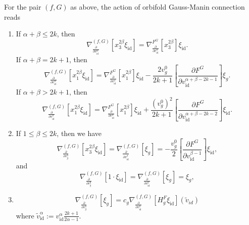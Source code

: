 \documentclass[10pt,a4paper]{amsart}
\newcommand{\id}{\mathrm{id}}
\def\p{\partial }
\begin{document}
\begin{proposition}{\label{EF4}}
    For the pair $(f,G)$ as above, the action of orbifold Gauss-Manin connection reads
\begin{enumerate}
\item If $\alpha+\beta \le 2k$, then
\[
\nabla_{\frac{\partial}{\partial v^\alpha_{\id}}}^{(f,G)}[x_3^{2\beta}\xi_{\id}] = \nabla^{F^G}_{\frac{\partial}{\partial v^\alpha_{\id}}}[x_3^{2\beta}]\xi_{\id}.
\]
If $\alpha+\beta = 2k+1$, then
\[
\nabla_{\frac{\partial}{\partial v^\alpha_{\id}}}^{(f,G)}[x_1^{2\beta}\xi_{\id}] = \nabla^{F^G}_{\frac{\partial}{\partial v^\alpha_{\id}}}[x_1^{2\beta}]\xi_{\id} - \frac{2v_g^0}{2k+1} \left[\frac{\p F^G}{\p v_\id^{\alpha+\beta-2k-1}}\right]
\xi_{g}.
\]
If $\alpha+\beta > 2k+1$, then
\[
\nabla_{\frac{\partial}{\partial v^\alpha_{\id}}}^{(f,G)}[x_1^{2\beta}\xi_{\id}] = \nabla^{F^G}_{\frac{\partial}{\partial v^\alpha_{\id}}}[x_1^{2\beta}]\xi_{\id} + \frac{(v_g^0)^2}{2k+1} 
\left[\frac{\p F^G}{\p v_\id^{\alpha+\beta-2k-2}}\right]\xi_{\id}.
\]

\item If $1 \le \beta \le 2k$, then we have
\[
\nabla_{\frac{\partial}{\partial v^0_{g}}}^{(f,G)}[x_3^{2\beta}\xi_{\id}] = \nabla_{\frac{\partial}{\partial v^\beta_{\id}}}^{(f,G)}[\xi_{g}] = - \frac{v_g^0}{2}\left[\frac{\partial F^G}{\partial v^{\beta-1}_{\id}}\right]\xi_{\id},
\]
and
\[
\nabla_{\frac{\partial}{\partial v^0_{g}}}^{(f,G)}[1 \cdot \xi_{\id}] 
= \nabla_{\frac{\partial}{\partial v^0_{\id}}}^{(f,G)}[\xi_{g}] 
= \xi_g,
\]
\item 
\[
        \nabla_{\frac{\partial}{\partial v^0_{g}}}^{(f,G)}[\xi_{g}] = 
        c_g \nabla_{\frac{\partial}{\partial v^0_{\id}}}^{(f,G)}[H^F_g \xi_{\id}](\widetilde v_{id})
    \]
where $\widetilde v_{\id}^{\alpha} := v_{\id}^{\alpha} \frac{2k + 1}{2\alpha -1}$.    

\end{enumerate}
\end{proposition}
\end{document}

